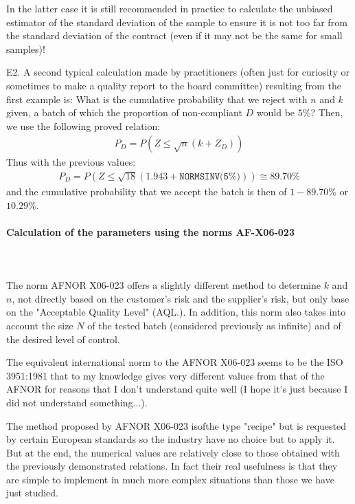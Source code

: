 	\begin{tcolorbox}[colframe=black,colback=white,sharp corners]
	\begin{tcolorbox}[title=Remark,colframe=black,arc=10pt]
	In the latter case it is still recommended in practice to calculate the unbiased estimator of the standard deviation of the sample to ensure it is not too far from the standard deviation of the contract (even if it may not be the same for small samples)!
	\end{tcolorbox}	
	E2. A second typical calculation made by practitioners (often just for curiosity or sometimes to make a quality report to the board committee) resulting from the first example is: What is the cumulative probability that we reject with $n$ and $k$ given, a batch of which the proportion of non-compliant $D$ would be $5\%$? Then, we use the following proved relation:
	\begin{gather*}
		P_D=P(Z\leq \sqrt{n}(k+Z_D))
	\end{gather*}
	Thus with the previous values:
	\begin{gather*}
		P_D=P(Z\leq \sqrt{18}(1.943+\texttt{NORMSINV(5\%)}))\cong 89.70\%
	\end{gather*}
	and the cumulative probability that we accept the batch is then of $1-89.70\%$ or $10.29\%$.
	\end{tcolorbox}
	
	\paragraph{Calculation of the parameters using the norms AF-X06-023}\mbox{}\\\\
	The norm AFNOR X06-023 offers a slightly different method to determine $k$ and $n$, not directly based on the customer's risk and the supplier's risk, but only base on the "Acceptable Quality Level" (AQL.). In addition, this norm also takes into account the size $N$ of the tested batch (considered previously as infinite) and of the desired level of control.
	\begin{tcolorbox}[title=Remark,colframe=black,arc=10pt]
	The equivalent international norm to the  AFNOR X06-023 seems to be the ISO 3951:1981 that to my knowledge gives very different values from that of the AFNOR for reasons that I don't understand quite well (I hope it's just because I did not understand something...).
	\end{tcolorbox}	
	The method proposed by AFNOR X06-023 isofthe type "recipe" but is requested by certain European standards so the industry have no choice but to apply it. But at the end, the numerical values are relatively close to those obtained with the previously demonstrated relations. In fact their real usefulness is that they are simple to implement in much more complex situations than those we have just studied.

